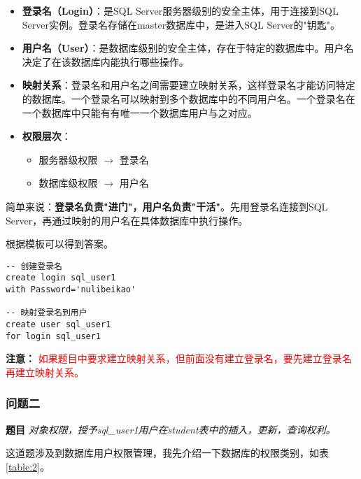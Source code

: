 \begin{itemize}
  \item \textbf{登录名（Login）}：是SQL Server服务器级别的安全主体，用于连接到SQL Server实例。登录名存储在master数据库中，是进入SQL Server的"钥匙"。

  \item \textbf{用户名（User）}：是数据库级别的安全主体，存在于特定的数据库中。用户名决定了在该数据库内能执行哪些操作。

  \item \textbf{映射关系}：登录名和用户名之间需要建立映射关系，这样登录名才能访问特定的数据库。一个登录名可以映射到多个数据库中的不同用户名。一个登录名在一个数据库中只能有有唯一一个数据库用户与之对应。

  \item \textbf{权限层次}：
    \begin{itemize}
      \item 服务器级权限 $\rightarrow$ 登录名
      \item 数据库级权限 $\rightarrow$ 用户名
    \end{itemize}
\end{itemize}

\qquad 简单来说：\textbf{登录名负责"进门"，用户名负责"干活"}。先用登录名连接到SQL Server，再通过映射的用户名在具体数据库中执行操作。

\qquad 根据模板可以得到答案。

\begin{mdframed}[backgroundcolor=blue!5]
\begin{verbatim}
-- 创建登录名
create login sql_user1
with Password='nulibeikao'

-- 映射登录名到用户
create user sql_user1
for login sql_user1
\end{verbatim}
\end{mdframed}

\textbf{注意：} \textcolor{Red}{如果题目中要求建立映射关系，但前面没有建立登录名，要先建立登录名再建立映射关系。}

\subsubsection{问题二}

\textbf{题目} \emph{对象权限，授予sql\_user1用户在student表中的插入，更新，查询权利。}

\vspace{6pt}

\qquad 这道题涉及到数据库用户权限管理，我先介绍一下数据库的权限类别，如表\ref{table:2}。

